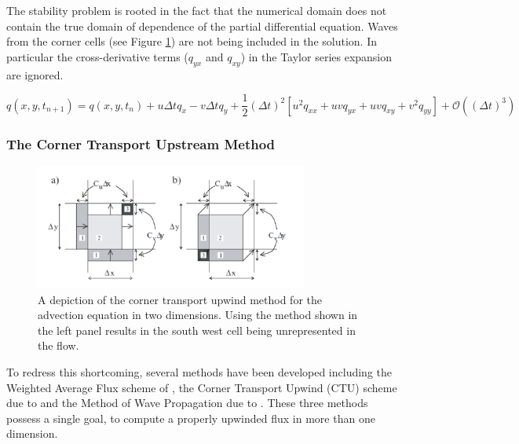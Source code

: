 The stability problem is rooted in the fact that the numerical domain does not contain the true domain of dependence of the partial differential equation. 
Waves from the corner cells (see Figure \ref{fig:CTUMethod}) are not being included in the solution.
In particular the cross-derivative terms ($q_{yx}$ and $q_{xy}$) in the Taylor series expansion are ignored.

\begin{equation}
q(x,y,t_{n+1}) = q(x,y,t_n) + u \Delta t q_x - v \Delta t q_y
+ \frac{1}{2} (\Delta t)^2 \left[  
u^2 q_{xx} +
u v q_{yx} +
u v q_{xy} +
v^2 q_{yy} 
\right] 
+ \mathcal{O}( (\Delta t)^3 ) 
\end{equation}

\subsubsection{The Corner Transport Upstream Method}


\begin{figure}[t]
\centering
\includegraphics[width=9cm]{ctu}
\caption{
A depiction of the corner transport upwind method for the advection equation in two dimensions.
Using the method shown in the left panel results in the south west cell being unrepresented in the flow.
}
\label{fig:CTUMethod} %
\end{figure}

To redress this shortcoming, several methods have been developed including the
Weighted Average Flux scheme of \citet{Toro:1997:RSN}, 
the Corner Transport Upwind (CTU) scheme due to \citet{Colella90:_multida} and 
the Method of Wave Propagation due to \citet{Leveque1997}. These three methods
possess a single goal, to compute a properly upwinded flux in more than one dimension.



